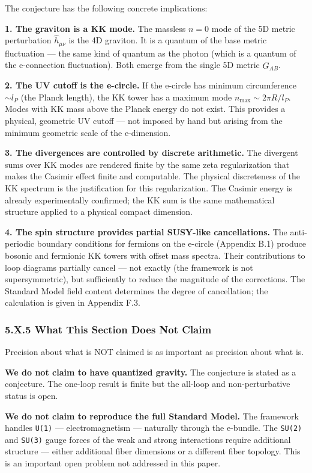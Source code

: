 \documentclass[aps,prd,preprint,superscriptaddress,longbibliography,floatfix]{revtex4-2}
\theoremstyle{remark}
\begin{document}
The conjecture has the following concrete implications:

\textbf{1. The graviton is a KK mode.} The massless $n = 0$ mode of the 5D metric perturbation $\hat{h}_{\mu\nu}$ is the 4D graviton. It is a quantum of the base metric fluctuation --- the same kind of quantum as the photon (which is a quantum of the e-connection fluctuation). Both emerge from the single 5D metric $\hat{G}_{AB}$.

\textbf{2. The UV cutoff is the e-circle.} If the e-circle has minimum circumference $\sim l_P$ (the Planck length), the KK tower has a maximum mode $n_{\max} \sim 2\pi R/l_P$. Modes with KK mass above the Planck energy do not exist. This provides a physical, geometric UV cutoff --- not imposed by hand but arising from the minimum geometric scale of the e-dimension.

\textbf{3. The divergences are controlled by discrete arithmetic.} The divergent sums over KK modes are rendered finite by the same zeta regularization that makes the Casimir effect finite and computable. The physical discreteness of the KK spectrum is the justification for this regularization. The Casimir energy is already experimentally confirmed; the KK sum is the same mathematical structure applied to a physical compact dimension.

\textbf{4. The spin structure provides partial SUSY-like cancellations.} The anti-periodic boundary conditions for fermions on the e-circle (Appendix B.1) produce bosonic and fermionic KK towers with offset mass spectra. Their contributions to loop diagrams partially cancel --- not exactly (the framework is not supersymmetric), but sufficiently to reduce the magnitude of the corrections. The Standard Model field content determines the degree of cancellation; the calculation is given in Appendix F.3.



\subsubsection{5.X.5 What This Section Does Not Claim}

Precision about what is NOT claimed is as important as precision about what is.

\textbf{We do not claim to have quantized gravity.} The conjecture is stated as a conjecture. The one-loop result is finite but the all-loop and non-perturbative status is open.

\textbf{We do not claim to reproduce the full Standard Model.} The framework handles \texttt{U(1)} --- electromagnetism --- naturally through the e-bundle. The \texttt{SU(2)} and \texttt{SU(3)} gauge forces of the weak and strong interactions require additional structure --- either additional fiber dimensions or a different fiber topology. This is an important open problem not addressed in this paper.
\end{document}
